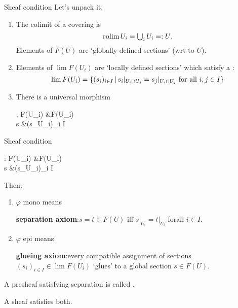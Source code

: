 \begin{frame}{Sheaf condition}
	Let's unpack it:
	\vfill
	\begin{enumerate}
		\item The colimit of a covering is
		\begin{equation*}
			{\textstyle \operatorname*{colim}U_i = \bigcup_i U_i =: U}.
		\end{equation*}
		Elements of $F(U)$ are `globally defined sections' (wrt to $U$).
		\vspace{3ex}
		\item Elements of $\lim F(U_i)$ are `locally defined sections' which satisfy a :
		\begin{equation*}
			\lim F(U_i) = \{(s_i)_{i \in I} \,|\, s_i \vert_{U_i \cap U_j} = s_j \vert_{U_i \cap U_j}\ \text{for all $i,j \in I$}\}
		\end{equation*}
		\vspace{1ex}
		\item There is a universal morphism
		\begin{eqalign*}
			\varphi : F(\colim U_i) &\longto \lim F(U_i)\\
			s &\longmapsto (s\vert_{U_i})_{i \in I}
		\end{eqalign*}
	\end{enumerate}
	\vfill
\end{frame}

\begin{frame}{Sheaf condition}
	\begin{eqalign*}
		\varphi : F(\colim U_i) &\longto \lim F(U_i)\\
		s &\longmapsto (s\vert_{U_i})_{i \in I}
	\end{eqalign*}
	Then:
	\begin{enumerate}
		\item $\varphi$ mono means
		\begin{center}
			\textbf{separation axiom}:\quad $s=t \in F(U)$ iff $s\vert_{U_i} = t\vert_{U_i}$ forall $i \in I$.
		\end{center}
		\item $\varphi$ epi means
		\begin{center}
			\textbf{glueing axiom}:\quad every compatible assignment of sections $(s_i)_{i \in I} \in \lim F(U_i)$ `glues' to a global section $s \in F(U)$.
		\end{center}
	\end{enumerate}
	\vfill
	A presheaf satisfying separation is called .

	A sheaf satisfies both.
\end{frame}

